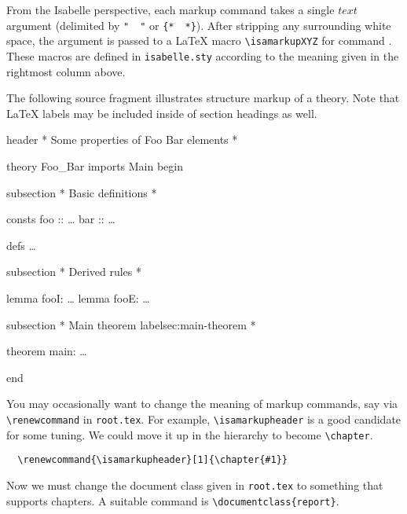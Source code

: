 \begin{isabellebody}
\begin{isamarkuptext}
  From the Isabelle perspective, each markup command takes a single
  $text$ argument (delimited by \verb,",~\isa{{\isasymdots}}~\verb,", or
  \verb,{,\verb,*,~\isa{{\isasymdots}}~\verb,*,\verb,},).  After stripping any
  surrounding white space, the argument is passed to a {\LaTeX} macro
  \verb,\isamarkupXYZ, for command .  These macros are
  defined in \verb,isabelle.sty, according to the meaning given in the
  rightmost column above.

  \medskip The following source fragment illustrates structure markup
  of a theory.  Note that {\LaTeX} labels may be included inside of
  section headings as well.

  \begin{ttbox}
  header {\ttlbrace}* Some properties of Foo Bar elements *{\ttrbrace}

  theory Foo_Bar
  imports Main
  begin

  subsection {\ttlbrace}* Basic definitions *{\ttrbrace}

  consts
    foo :: \dots
    bar :: \dots

  defs \dots

  subsection {\ttlbrace}* Derived rules *{\ttrbrace}

  lemma fooI: \dots
  lemma fooE: \dots

  subsection {\ttlbrace}* Main theorem {\ttback}label{\ttlbrace}sec:main-theorem{\ttrbrace} *{\ttrbrace}

  theorem main: \dots

  end
  \end{ttbox}\vspace{-\medskipamount}

  You may occasionally want to change the meaning of markup commands,
  say via \verb,\renewcommand, in \texttt{root.tex}.  For example,
  \verb,\isamarkupheader, is a good candidate for some tuning.  We
  could move it up in the hierarchy to become \verb,\chapter,.

\begin{verbatim}
  \renewcommand{\isamarkupheader}[1]{\chapter{#1}}
\end{verbatim}

  \noindent Now we must change the document class given in
  \texttt{root.tex} to something that supports chapters.  A suitable
  command is \verb,\documentclass{report},.


\end{isamarkuptext}
\end{isabellebody}

